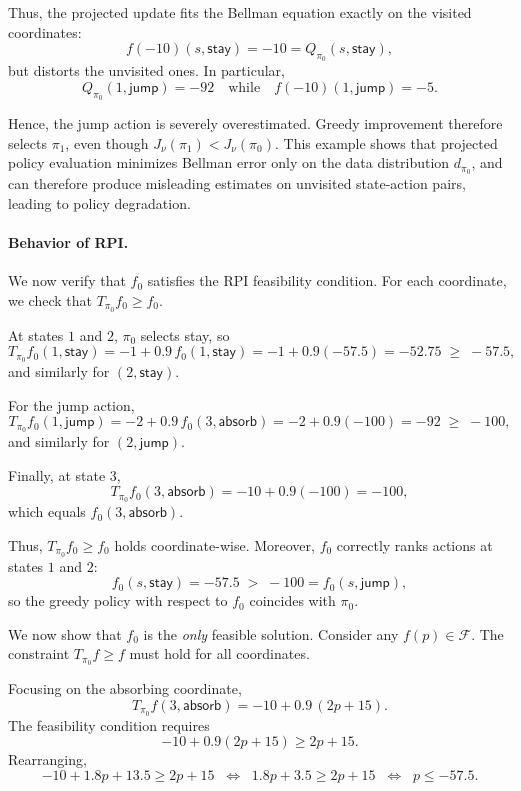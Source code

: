 \documentclass[twoside]{article}
\theoremstyle{plain}
\theoremstyle{definition}
\theoremstyle{remark}
\begin{document}
Thus, the projected update fits the Bellman equation exactly on the visited coordinates:
\[
f(-10)(s,\textsf{stay}) = -10 = Q_{\pi_0}(s,\textsf{stay}),
\]
but distorts the unvisited ones. In particular,
\[
Q_{\pi_0}(1,\textsf{jump}) = -92
\quad \text{while} \quad
f(-10)(1,\textsf{jump}) = -5.
\]

Hence, the \textsf{jump} action is severely overestimated. Greedy improvement therefore selects $\pi_1$, even though $J_\nu(\pi_1) < J_\nu(\pi_0)$. This example shows that projected policy evaluation minimizes Bellman error only on the data distribution $d_{\pi_0}$, and can therefore produce misleading estimates on unvisited state-action pairs, leading to policy degradation.

\paragraph{Behavior of RPI.}


We now verify that $f_0$ satisfies the RPI feasibility condition. 
For each coordinate, we check that $T_{\pi_0} f_0 \ge f_0.$

At states $1$ and $2$, $\pi_0$ selects \textsf{stay}, so
\[
T_{\pi_0} f_0(1,\textsf{stay})
= -1 + 0.9\, f_0(1,\textsf{stay})
= -1 + 0.9(-57.5)
= -52.75 \;\ge\; -57.5,
\]
and similarly for $(2,\textsf{stay})$.

For the \textsf{jump} action,
\[
T_{\pi_0} f_0(1,\textsf{jump})
= -2 + 0.9\, f_0(3,\textsf{absorb})
= -2 + 0.9(-100)
= -92 \;\ge\; -100,
\]
and similarly for $(2,\textsf{jump})$.

Finally, at state $3$,
\[
T_{\pi_0} f_0(3,\textsf{absorb})
= -10 + 0.9(-100)
= -100,
\]
which equals $f_0(3,\textsf{absorb})$.

Thus, $T_{\pi_0} f_0 \ge f_0$ holds coordinate-wise. Moreover, $f_0$ correctly ranks actions at states $1$ and $2$:
\[
f_0(s,\textsf{stay}) = -57.5 \;>\; -100 = f_0(s,\textsf{jump}),
\]
so the greedy policy with respect to $f_0$ coincides with $\pi_0$.


We now show that $f_0$ is the \emph{only} feasible solution. 
Consider any $f(p) \in \mathcal F$. The constraint $T_{\pi_0} f \ge f$ must hold for all coordinates.

Focusing on the absorbing coordinate,
\[
T_{\pi_0} f(3,\textsf{absorb})
= -10 + 0.9\, (2p+15).
\]
The feasibility condition requires
\[
-10 + 0.9(2p+15) \ge 2p+15.
\]
Rearranging,
\[
-10 + 1.8p + 13.5 \ge 2p + 15
\;\;\Longleftrightarrow\;\;
1.8p + 3.5 \ge 2p + 15
\;\;\Longleftrightarrow\;\;
p \le -57.5.
\]
\end{document}
